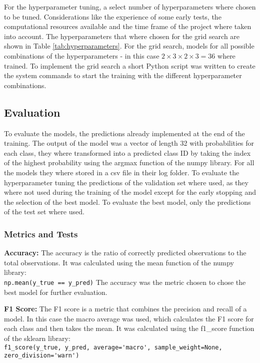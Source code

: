 For the hyperparameter tuning, a select number of hyperparameters where chosen to be tuned.
Considerations like the experience of some early tests, the computational resources available
and the time frame of the project where taken into account. The hyperparameters that where
chosen for the grid search are shown in Table \ref{tab:hyperparameters}. For the grid search,
models for all possible combinations of the hyperparameters - 
in this case \( 2 \times 3 \times 2 \times 3 = 36 \) where trained. To implement the grid search a short Python
script was written to create the system commands to start the training with the different
hyperparameter combinations.



\subsection{Evaluation}%

To evaluate the models, the predictions already implemented at the end of the training.
The output of the model was a vector of length 32 with probabilities for each class, they where
transformed into a predicted class ID by taking the index of the highest probability
using the argmax function of the numpy library. For all the models they where stored in a csv file
in their log folder. To evaluate the hyperparameter tuning the predictions of the validation set
where used, as they where not used during the training of the model except for the early stopping
and the selection of the best model. To evaluate the best model, only the predictions of the test set
where used.

\subsubsection{Metrics and Tests}

\textbf{Accuracy:} The accuracy is the ratio of correctly predicted observations to the total observations.
It was calculated using the mean function of the numpy library:\\ 
\lstinline{np.mean(y_true == y_pred)}
The accuracy was the metric chosen to chose the best model for further evaluation.

\textbf{F1 Score:} The F1 score is a metric that combines the precision and recall of a model. In this
case the macro average was used, which calculates the F1 score for each class and then takes the mean.
It was calculated using the f1\_score function of the sklearn library:\\ 
\lstinline{f1_score(y_true, y_pred, average='macro', sample_weight=None, zero_division='warn')}

